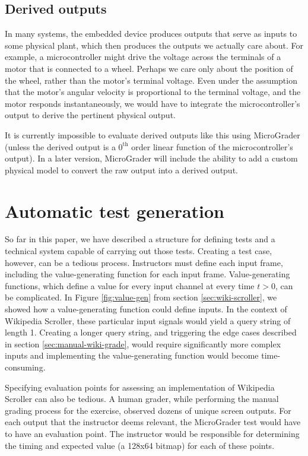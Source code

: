 \documentclass[12pt]{article}
\begin{document}
\subsection{Derived outputs}
\label{sec:derived-outputs}
In many systems, the embedded device produces outputs that serve as inputs to some physical plant, which then produces the outputs we actually care about.  For example, a microcontroller might drive the voltage across the terminals of a motor that is connected to a wheel.  Perhaps we care only about the position of the wheel, rather than the motor's terminal voltage.  Even under the assumption that the motor's angular velocity is proportional to the terminal voltage, and the motor responds instantaneously, we would have to integrate the microcontroller's output to derive the pertinent physical output.

It is currently impossible to evaluate derived outputs like this using MicroGrader (unless the derived output is a $0^\text{th}$ order linear function of the microcontroller's output).  In a later version, MicroGrader will include the ability to add a custom physical model to convert the raw output into a derived output.

\clearpage
\section{Automatic test generation}
So far in this paper, we have described a structure for defining tests and a technical system capable of carrying out those tests.  Creating a test case, however, can be a tedious process.  Instructors must define each input frame, including the value-generating function for each input frame.  Value-generating functions, which define a value for every input channel at every time $t>0$, can be complicated.  In Figure \ref{fig:value-gen} from section \ref{sec:wiki-scroller}, we showed how a value-generating function could define inputs.  In the context of Wikipedia Scroller, these particular input signals would yield a query string of length 1.  Creating a longer query string, and triggering the edge cases described in section \ref{sec:manual-wiki-grade}, would require significantly more complex inputs and implementing the value-generating function would become time-consuming.

Specifying evaluation points for assessing an implementation of Wikipedia Scroller can also be tedious.  A human grader, while performing the manual grading process for the exercise, observed dozens of unique screen outputs.  For each output that the instructor deems relevant, the MicroGrader test would have to have an evaluation point.  The instructor would be responsible for determining the timing and expected value (a 128x64 bitmap) for each of these points.
\end{document}

